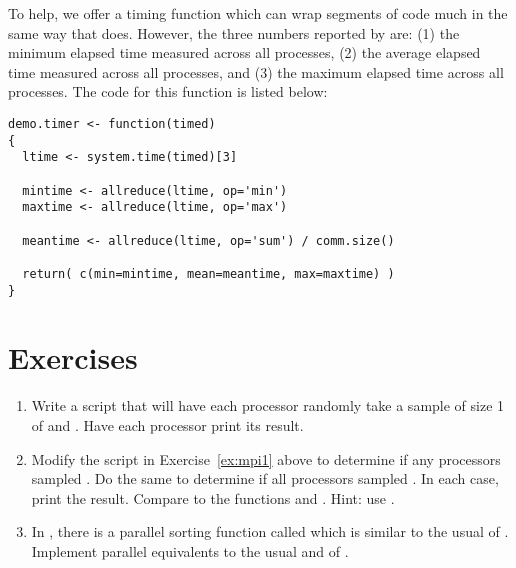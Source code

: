 To help, we offer a timing function  which can wrap segments of code much in the same way that  does.  However, the three numbers reported by  are: (1) the minimum elapsed time measured across all processes, (2) the average elapsed time measured across all processes, and (3) the maximum elapsed time across all processes.  The code for this function is listed below:

\begin{lstlisting}[language=rr,title=Timer Function]
demo.timer <- function(timed)
{
  ltime <- system.time(timed)[3]
  
  mintime <- allreduce(ltime, op='min')
  maxtime <- allreduce(ltime, op='max')
  
  meantime <- allreduce(ltime, op='sum') / comm.size()
  
  return( c(min=mintime, mean=meantime, max=maxtime) )
}
\end{lstlisting}



\section{Exercises}
\label{sec:mpi_for_the_r_user_exercise}

\begin{enumerate}[label=\thechapter-\arabic*]
\item Write a script that will have each processor randomly take a sample of size 1 of  and .  Have each processor print its result.\label{ex:mpi1}
\item Modify the script in Exercise~\ref{ex:mpi1} above to determine if any processors sampled .  Do the same to determine if all processors sampled .  In each case, print the result.  Compare to the functions  and .
      {\color{blue} Hint:  use .}
\item In , there is a parallel sorting function called
 which is similar to the usual  of .
Implement parallel equivalents to the usual  and 
of .

\end{enumerate}




